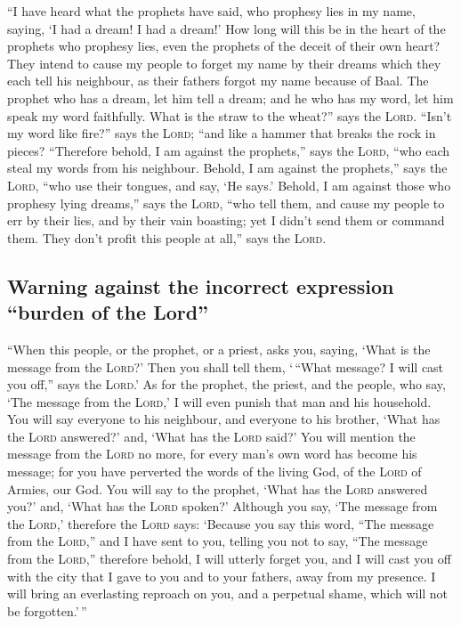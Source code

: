  ``I have heard what the prophets have said, who prophesy
lies in my name, saying, `I had a dream! I had a dream!' 
How long will this be in the heart of the prophets who prophesy lies,
even the prophets of the deceit of their own heart?  They
intend to cause my people to forget my name by their dreams which they
each tell his neighbour, as their fathers forgot my name because of
Baal.  The prophet who has a dream, let him tell a dream;
and he who has my word, let him speak my word faithfully. What is the
straw to the wheat?'' says the \textsc{Lord}.  ``Isn't my
word like fire?'' says the \textsc{Lord}; ``and like a hammer that
breaks the rock in pieces?  ``Therefore behold, I am
against the prophets,'' says the \textsc{Lord}, ``who each steal my
words from his neighbour.  Behold, I am against the
prophets,'' says the \textsc{Lord}, ``who use their tongues, and say,
`He says.'  Behold, I am against those who prophesy lying
dreams,'' says the \textsc{Lord}, ``who tell them, and cause my people
to err by their lies, and by their vain boasting; yet I didn't send them
or command them. They don't profit this people at all,'' says the
\textsc{Lord}.

\hypertarget{warning-against-the-incorrect-expression-burden-of-the-lord}{%
\subsection{Warning against the incorrect expression ``burden of the
Lord''}\label{warning-against-the-incorrect-expression-burden-of-the-lord}}

 ``When this people, or the prophet, or a priest, asks
you, saying, `What is the message from the \textsc{Lord}?' Then you
shall tell them, `\,``What message? I will cast you off,'' says the
\textsc{Lord}.'  As for the prophet, the priest, and the
people, who say, `The message from the \textsc{Lord},' I will even
punish that man and his household.  You will say everyone
to his neighbour, and everyone to his brother, `What has the
\textsc{Lord} answered?' and, `What has the \textsc{Lord} said?'
 You will mention the message from the \textsc{Lord} no
more, for every man's own word has become his message; for you have
perverted the words of the living God, of the \textsc{Lord} of Armies,
our God.  You will say to the prophet, `What has the
\textsc{Lord} answered you?' and, `What has the \textsc{Lord} spoken?'
 Although you say, `The message from the \textsc{Lord},'
therefore the \textsc{Lord} says: `Because you say this word, ``The
message from the \textsc{Lord},'' and I have sent to you, telling you
not to say, ``The message from the \textsc{Lord},'' 
therefore behold, I will utterly forget you, and I will cast you off
with the city that I gave to you and to your fathers, away from my
presence.  I will bring an everlasting reproach on you,
and a perpetual shame, which will not be forgotten.'\,''


